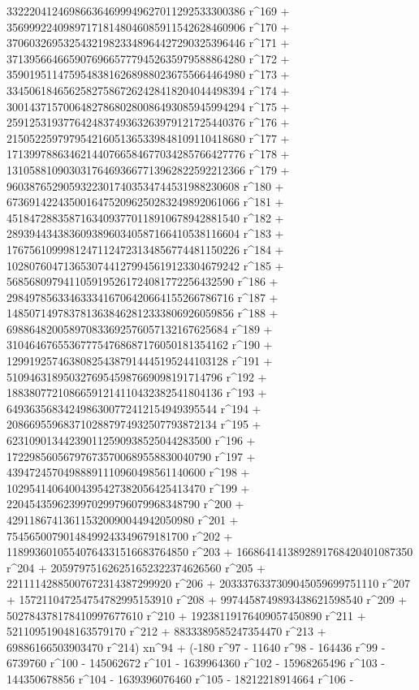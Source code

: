        332220412469866364699949627011292533300386 r^169 + 
       356999224098971718148046085911542628460906 r^170 + 
       370603269532543219823348964427290325396446 r^171 + 
       371395664665907696657779452635979588864280 r^172 + 
       359019511475954838162689880236755664464980 r^173 + 
       334506184656258275867262428418204044498394 r^174 + 
       300143715700648278680280086493085945994294 r^175 + 
       259125319377642483749363263979121725440376 r^176 + 
       215052259797954216051365339848109110418680 r^177 + 
       171399788634621440766584677034285766427776 r^178 + 
       131058810903031764693667713962822592212366 r^179 + 
       96038765290593223017403534744531988230608 r^180 + 
       67369142243500164752096250283249892061066 r^181 + 
       45184728835871634093770118910678942881540 r^182 + 
       28939443438360938960340587166410538116604 r^183 + 
       17675610999812471124723134856774481150226 r^184 + 
       10280760471365307441279945619123304679242 r^185 + 
       5685680979411059195261724081772256432590 r^186 + 
       2984978563346333416706420664155266786716 r^187 + 
       1485071497837813638462812333806926059856 r^188 + 
       698864820058970833692576057132167625684 r^189 + 
       310464676553677754768687176050181354162 r^190 + 
       129919257463808254387914445195244103128 r^191 + 
       51094631895032769545987669098191714796 r^192 + 
       18838077210866591214110432382541804136 r^193 + 
       6493635683424986300772412154949395544 r^194 + 
       2086695596837102887974932507793872134 r^195 + 
       623109013442390112590938525044283500 r^196 + 
       172298560567976735700689558830040790 r^197 + 
       43947245704988891110960498561140600 r^198 + 
       10295414064004395427382056425413470 r^199 + 
       2204543596239970299796079968348790 r^200 + 
       429118674136115320090044942050980 r^201 + 
       75456500790148499243349679181700 r^202 + 
       11899360105540764331516683764850 r^203 + 
       1668641413892891768420401087350 r^204 + 
       205979751626251652322374626560 r^205 + 
       22111142885007672314387299920 r^206 + 
       2033376337309045059699751110 r^207 + 
       157211047254754782995153910 r^208 + 
       9974458749893438621598540 r^209 + 
       502784378178410997677610 r^210 + 
       19238119176409057450890 r^211 + 521109519048163579170 r^212 + 
       8833389585247354470 r^213 + 
       69886166503903470 r^214) xn^94 + (-180 r^97 - 11640 r^98 - 
       164436 r^99 - 6739760 r^100 - 145062672 r^101 - 
       1639964360 r^102 - 15968265496 r^103 - 144350678856 r^104 - 
       1639396076460 r^105 - 18212218914664 r^106 - 
